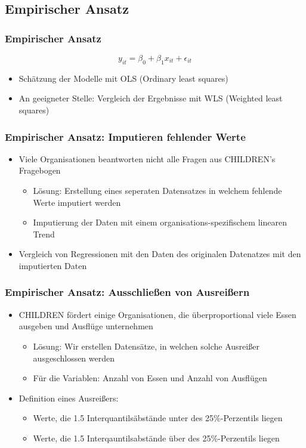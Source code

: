 \subsection{Empirischer Ansatz}

\begin{frame}
\frametitle{Empirischer Ansatz}

\begin{equation}
\label{SimpleLinearModel}
  y_{it} = \beta_0 + \beta_1 x_{it} + \epsilon_{it}
\end{equation}

\begin{itemize}
\item Schätzung der Modelle mit OLS (Ordinary least squares)
\item An geeigneter Stelle: Vergleich der Ergebnisse mit WLS (Weighted least squares)
\end{itemize}

\end{frame}

\begin{frame}[fragile]
\frametitle{Empirischer Ansatz: Imputieren fehlender Werte}
\begin{itemize}
\item Viele Organisationen beantworten nicht alle Fragen aus CHILDREN's Fragebogen
\begin{itemize}
\item Lösung: Erstellung eines seperaten Datensatzes in welchem fehlende Werte imputiert werden
\item Imputierung der Daten mit einem organisations-spezifischem linearen Trend
\end{itemize}
\item Vergleich von Regressionen mit den Daten des originalen Datenatzes mit den imputierten Daten
\end{itemize}
\end{frame}


\begin{frame}[fragile]
\frametitle{Empirischer Ansatz: Ausschließen von Ausreißern}
\begin{itemize}
\item CHILDREN fördert einige Organisationen, die überproportional viele Essen ausgeben und Ausflüge unternehmen
\begin{itemize}
\item Lösung: Wir erstellen Datensätze, in welchen solche Ausreißer ausgeschlossen werden
\item Für die Variablen: Anzahl von Essen und Anzahl von Ausflügen
\end{itemize}
\item Definition eines Ausreißers:
\begin{itemize}
\item Werte, die 1.5 Interquantilsäbstände unter des 25\%-Perzentils liegen
\item Werte, die 1.5 Interqauntilsabstände über des 25\%-Perzentils liegen
\end{itemize}
\end{itemize}
\end{frame}

